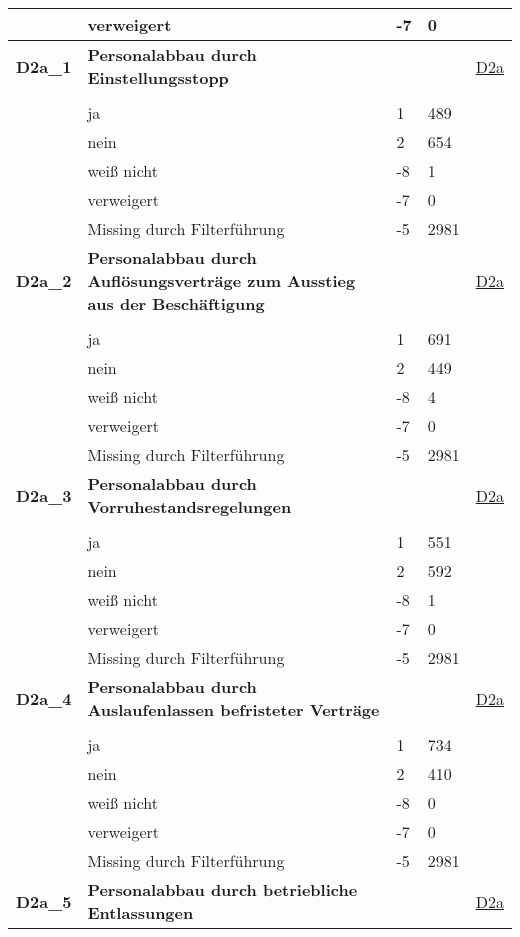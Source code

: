 \begin{longtable}{| L{2.5cm} | L{8.25cm}| C{1.5cm} | R{1.25cm} | C{2.25cm} |  }
   & verweigert & -7 & 0 &  \\ 
   \midrule
\textbf{D2a\_1}\label{var:suf:D2a:1} & \textbf{Personalabbau durch Einstellungsstopp} &  &  & \hyperref[D2a]{D2a} \\ 
   &  &  &  &  \\ 
   & ja & 1 & 489 &  \\ 
   & nein & 2 & 654 &  \\ 
   & weiß nicht & -8 & 1 &  \\ 
   & verweigert & -7 & 0 &  \\ 
   & Missing durch Filterführung & -5 & 2981 &  \\ 
   \midrule
\textbf{D2a\_2}\label{var:suf:D2a:2} & \textbf{Personalabbau durch Auflösungsverträge zum Ausstieg aus der Beschäftigung} &  &  & \hyperref[D2a]{D2a} \\ 
   &  &  &  &  \\ 
   & ja & 1 & 691 &  \\ 
   & nein & 2 & 449 &  \\ 
   & weiß nicht & -8 & 4 &  \\ 
   & verweigert & -7 & 0 &  \\ 
   & Missing durch Filterführung & -5 & 2981 &  \\ 
   \midrule
\textbf{D2a\_3}\label{var:suf:D2a:3} & \textbf{Personalabbau durch Vorruhestandsregelungen} &  &  & \hyperref[D2a]{D2a} \\ 
   &  &  &  &  \\ 
   & ja & 1 & 551 &  \\ 
   & nein & 2 & 592 &  \\ 
   & weiß nicht & -8 & 1 &  \\ 
   & verweigert & -7 & 0 &  \\ 
   & Missing durch Filterführung & -5 & 2981 &  \\ 
   \midrule
\textbf{D2a\_4}\label{var:suf:D2a:4} & \textbf{Personalabbau durch Auslaufenlassen befristeter Verträge} &  &  & \hyperref[D2a]{D2a} \\ 
   &  &  &  &  \\ 
   & ja & 1 & 734 &  \\ 
   & nein & 2 & 410 &  \\ 
   & weiß nicht & -8 & 0 &  \\ 
   & verweigert & -7 & 0 &  \\ 
   & Missing durch Filterführung & -5 & 2981 &  \\ 
   \midrule
\textbf{D2a\_5}\label{var:suf:D2a:5} & \textbf{Personalabbau durch betriebliche Entlassungen} &  &  & \hyperref[D2a]{D2a} \\ 

\end{longtable}
